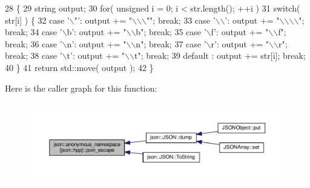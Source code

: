 \begin{DoxyCode}
28                                             \{
29         \textcolor{keywordtype}{string} output;
30         \textcolor{keywordflow}{for}( \textcolor{keywordtype}{unsigned} i = 0; i < str.length(); ++i )
31             \textcolor{keywordflow}{switch}( str[i] ) \{
32                 \textcolor{keywordflow}{case} \textcolor{charliteral}{'\(\backslash\)"'}: output += \textcolor{stringliteral}{"\(\backslash\)\(\backslash\)\(\backslash\)""}; \textcolor{keywordflow}{break};
33                 \textcolor{keywordflow}{case} \textcolor{charliteral}{'\(\backslash\)\(\backslash\)'}: output += \textcolor{stringliteral}{"\(\backslash\)\(\backslash\)\(\backslash\)\(\backslash\)"}; \textcolor{keywordflow}{break};
34                 \textcolor{keywordflow}{case} \textcolor{charliteral}{'\(\backslash\)b'}: output += \textcolor{stringliteral}{"\(\backslash\)\(\backslash\)b"};  \textcolor{keywordflow}{break};
35                 \textcolor{keywordflow}{case} \textcolor{charliteral}{'\(\backslash\)f'}: output += \textcolor{stringliteral}{"\(\backslash\)\(\backslash\)f"};  \textcolor{keywordflow}{break};
36                 \textcolor{keywordflow}{case} \textcolor{charliteral}{'\(\backslash\)n'}: output += \textcolor{stringliteral}{"\(\backslash\)\(\backslash\)n"};  \textcolor{keywordflow}{break};
37                 \textcolor{keywordflow}{case} \textcolor{charliteral}{'\(\backslash\)r'}: output += \textcolor{stringliteral}{"\(\backslash\)\(\backslash\)r"};  \textcolor{keywordflow}{break};
38                 \textcolor{keywordflow}{case} \textcolor{charliteral}{'\(\backslash\)t'}: output += \textcolor{stringliteral}{"\(\backslash\)\(\backslash\)t"};  \textcolor{keywordflow}{break};
39                 default  : output += str[i]; \textcolor{keywordflow}{break};
40             \}
41         \textcolor{keywordflow}{return} std::move( output );
42     \}
\end{DoxyCode}
Here is the caller graph for this function\+:
\nopagebreak
\begin{figure}[H]
\begin{center}
\leavevmode
\includegraphics[width=350pt]{namespacejson_1_1anonymous__namespace_02json_8hpp_03_a623a6fca4cd1735d2bf3d081b875a350_icgraph}
\end{center}
\end{figure}
\mbox{\label{namespacejson_1_1anonymous__namespace_02json_8hpp_03_a6a3598f1545d6015c9db8015fc42f7ff}} 

